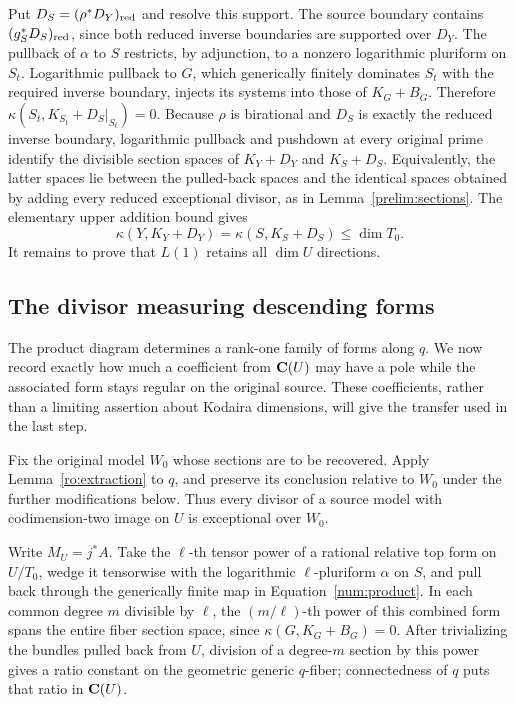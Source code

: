 Put $D_S=(\rho^*D_Y)_{\mathrm{red}}$ and resolve this support. The source
boundary contains $(g_S^*D_S)_{\mathrm{red}}$, since both reduced inverse
boundaries are supported over $D_Y$. The pullback of $\alpha$ to
$S$ restricts, by adjunction, to a nonzero logarithmic pluriform
on $S_t$. Logarithmic pullback to $G$, which generically finitely
dominates $S_t$ with the required inverse boundary, injects its
systems into those of $K_G+B_G$. Therefore
$\kappa(S_t,K_{S_t}+D_S|_{S_t})=0$.
Because $\rho$ is birational and $D_S$ is exactly the reduced
inverse boundary, logarithmic pullback and pushdown at every original
prime identify the divisible section spaces of $K_Y+D_Y$ and
$K_S+D_S$. Equivalently, the latter spaces lie between the pulled-back
spaces and the identical spaces obtained by adding every reduced
exceptional divisor, as in Lemma~\ref{prelim:sections}.
The elementary upper
addition bound gives
\begin{equation}\label{num:base-bound}
 \kappa(Y,K_Y+D_Y)
 =\kappa(S,K_S+D_S)\leq\dim T_0.
\end{equation}
It remains to prove that $L(1)$ retains all $\dim U$ directions.

\subsection{The divisor measuring descending forms}

The product diagram determines a rank-one family of forms along
$q$. We now record exactly how much a coefficient from $\mathbf C(U)$ may
have a pole while the associated form stays regular on the original
source. These coefficients, rather than a limiting assertion about
Kodaira dimensions, will give the transfer used in the last step.

Fix the original model $W_0$ whose sections are to be recovered.
Apply Lemma~\ref{ro:extraction} to $q$, and preserve its conclusion
relative to $W_0$ under the further modifications below.  Thus every
divisor of a source model with codimension-two image on $U$ is
exceptional over $W_0$.

Write $M_U=j^*A$. Take the $\ell$-th tensor power of a rational
relative top form on $U/T_0$, wedge it tensorwise with the logarithmic
$\ell$-pluriform $\alpha$ on $S$, and pull back through the generically
finite map in Equation~\eqref{num:product}. In each common degree $m$
divisible by $\ell$, the $(m/\ell)$-th power of this combined form
spans the entire fiber section space, since $\kappa(G,K_G+B_G)=0$.
After trivializing the bundles pulled back from $U$, division of a
degree-$m$ section by this power gives a ratio constant on the geometric
generic $q$-fiber; connectedness of $q$ puts that ratio in $\mathbf C(U)$.

